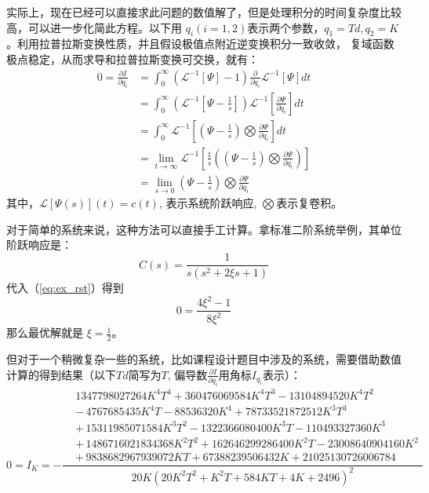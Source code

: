 \documentclass[../report.tex]{subfiles}
\begin{document}
实际上，现在已经可以直接求此问题的数值解了，但是处理积分的时间复杂度比较高，可以进一步化简此方程。以下用
$q_i( i=1,2)$表示两个参数，$q_1 = Td, q_2 = K$。利用拉普拉斯变换性质，并且假设极值点附近逆变换积分一致收敛，
复域函数极点稳定，从而求导和拉普拉斯变换可交换，就有：
\begin{align}
    0 = \frac{\partial I}{\partial q_i} &=\int_{0}^{\infty} (\mathcal{L} ^{-1}[\Psi ] -1)\frac{\partial}{\partial q_i} \mathcal{L} ^{-1}[\Psi ] dt\\
    &=\int_{0}^{\infty}(\mathcal{L} ^{-1}[\Psi - \frac{1}{s}])\mathcal{L} ^{-1}[\frac{\partial\Psi}{\partial q_i}] dt\\
    &=\int_{0}^{\infty}\mathcal{L} ^{-1}[(\Psi - \frac{1}{s})\bigotimes \frac{\partial\Psi}{\partial q_i}] dt\\
    &=\lim_{t \to \infty}  \mathcal{L} ^{-1}[\frac{1}{s}((\Psi - \frac{1}{s})\bigotimes \frac{\partial\Psi}{\partial q_i})]\\
    &=\lim_{s \to 0}  (\Psi - \frac{1}{s})\bigotimes \frac{\partial\Psi}{\partial q_i} \label{eq:ex_rst}
\end{align}
其中，$\mathcal{L}[\Psi(s)](t) =c(t) $, 表示系统阶跃响应, $\bigotimes$表示复卷积。

对于简单的系统来说，这种方法可以直接手工计算。拿标准二阶系统举例，其单位阶跃响应是：
\begin{equation}
    C(s) = \frac{1}{s(s^2+2\xi s + 1)}
\end{equation}
代入（\ref{eq:ex_rst}）得到
\begin{equation}
    0 = \frac{4 \xi^2 -1}{8\xi^2}
\end{equation}
那么最优解就是 $\xi=\frac{1}{2}$。

但对于一个稍微复杂一些的系统，比如课程设计题目中涉及的系统，需要借助数值计算的得到结果（以下$Td$简写为$T$,
偏导数$\frac{\partial I}{\partial q_i}$用角标$I_{q_i}$表示）：
\[
0=I_K = -\frac{
\begin{split}
&1347798027264 K^4 T^4 + 360476069584 K^4 T^3 - 13104894520 K^4 T^2 \\
&-\, 4767685435 K^4 T - 88536320 K^4 + 78733521872512 K^3 T^3 \\
&+\, 15311985071584 K^3 T^2 - 1322366080400 K^3 T - 110493327360 K^3 \\
&+\, 1486716021834368 K^2 T^2 + 162646299286400 K^2 T - 23008640904160 K^2 \\
&+\, 9838682967939072 K T + 67388239506432 K + 21025130726006784
\end{split}
}{20 K \left(20 K^2 T^2 + K^2 T + 584 K T + 4 K + 2496\right)^2}
\]
\end{document}
